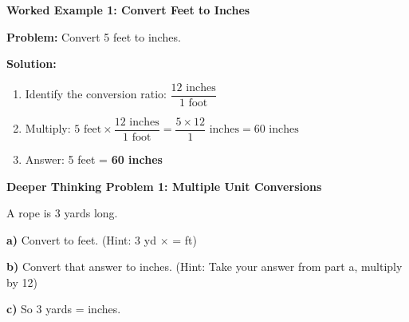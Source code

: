 \documentclass[12pt, letterpaper, fleqn]{article}
\newcommand{\blank}{\underline{\hspace{2.2cm}}}
\begin{document}
\vspace{4mm}

\begin{tcolorbox}[colback=white, colframe=black!25, boxrule=0.6pt, arc=4mm, left=6mm, right=6mm, top=5mm, bottom=5mm]

\textbf{Worked Example 1: Convert Feet to Inches}

\medskip

\textbf{Problem:} Convert 5 feet to inches.

\medskip

\noindent
\textbf{Solution:}

\begin{enumerate}
    \item Identify the conversion ratio: $\dfrac{12 \text{ inches}}{1 \text{ foot}}$
    
    \item Multiply: $5 \text{ feet} \times \dfrac{12 \text{ inches}}{1 \text{ foot}} = \dfrac{5 \times 12}{1} \text{ inches} = 60 \text{ inches}$
    
    \item Answer: 5 feet = \textbf{60 inches}
\end{enumerate}

\end{tcolorbox}

\vspace{4mm}

\begin{tcolorbox}[colback=yellow!15, colframe=orange, boxrule=1.5pt, arc=4mm, left=6mm, right=6mm, top=5mm, bottom=5mm]

\textbf{Deeper Thinking Problem 1: Multiple Unit Conversions}

\medskip

\noindent
A rope is 3 yards long.

\noindent
\textbf{a)} Convert to feet. (Hint: 3 yd $\times$ \blank = \blank ft)

\vspace{1.5cm}

\noindent
\textbf{b)} Convert that answer to inches. (Hint: Take your answer from part a, multiply by 12)

\vspace{1.5cm}

\noindent
\textbf{c)} So 3 yards = \blank inches.

\end{tcolorbox}
\end{document}
